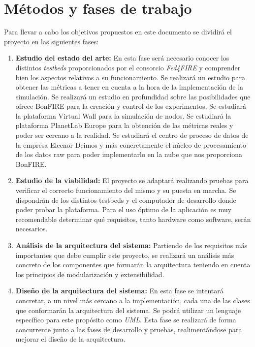 
\section{Métodos y fases de trabajo}
\label{sec:metodos}

Para llevar a cabo los objetivos propuestos en este documento se dividirá el proyecto en las siguientes fases:

\begin{enumerate}
\item \textbf{Estudio del estado del arte:} En esta fase será necesario conocer los distintos \emph{testbeds} proporcionados por el consorcio \emph{Fed4FIRE} y comprender bien  los aspectos relativos a su funcionamiento.
Se realizará un estudio para obtener las métricas a tener en cuenta a la hora de la implementación de la simulación.
Se realizará un estudio en profundidad sobre las posibilidades que ofrece BonFIRE para la creación y control de los experimentos.
Se estudiará la plataforma Virtual Wall para la simulación de nodos.
Se estudiará la plataforma PlanetLab Europe para la obtención de las métricas reales y poder ser cercano a la realidad.
Se estudiará el centro de proceso de datos de la empresa Elecnor Deimos y más concretamente el núcleo de procesamiento de los datos raw para poder implementarlo en la nube que nos proporciona BonFIRE.



\item\textbf{Estudio de la viabilidad:}
El proyecto se adaptará realizando pruebas para verificar el correcto funcionamiento del mismo y su
puesta en marcha. Se dispondrán de los distintos testbeds y el computador de desarrollo donde poder probar la plataforma. Para el uso óptimo de la aplicación
es muy recomendable determinar qué requisitos, tanto hardware como software, serán necesarios.

\item\textbf{Análisis de la arquitectura del sistema:}
Partiendo de los requisitos más importantes que debe cumplir este proyecto, se realizará un análisis más concreto de los componentes
que formarán la arquitectura teniendo en cuenta los principios de modularización y extensibilidad.

\item\textbf{Diseño de la arquitectura del sistema:}
En esta fase se intentará concretar, a un nivel más cercano a la implementación, cada una de las clases que conformarán la arquitectura del sistema.
Se podrá utilizar un lenguaje específico para este propósito como \emph{UML}. Esta fase se realizará de forma concurrente junto a las fases de desarrollo
y pruebas, realimentándose para mejorar el diseño de la arquitectura.



\end{enumerate}
